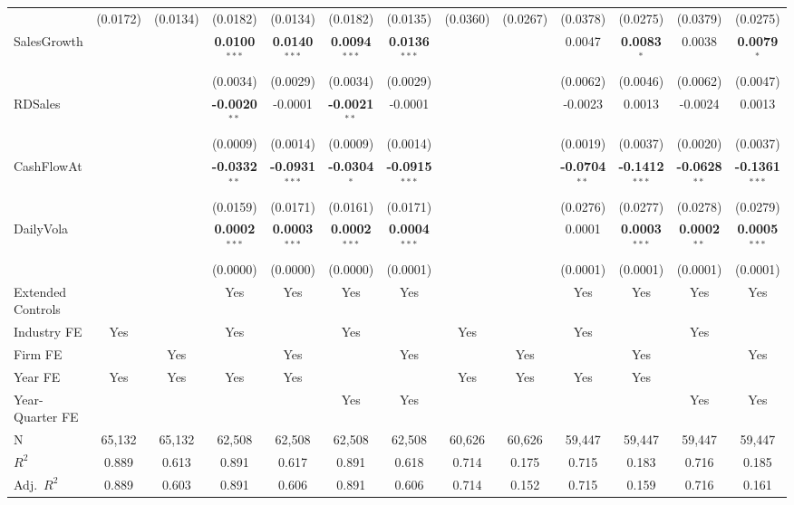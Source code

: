 \documentclass[11pt,a4paper]{article}
\begin{document}
\begin{table}[htbp]
\begin{tabular}{lcccccccccccc}
 & (0.0172) & (0.0134) & (0.0182) & (0.0134) & (0.0182) & (0.0135) & (0.0360) & (0.0267) & (0.0378) & (0.0275) & (0.0379) & (0.0275) \\
SalesGrowth &  &  & \textbf{0.0100}$^{***}$ & \textbf{0.0140}$^{***}$ & \textbf{0.0094}$^{***}$ & \textbf{0.0136}$^{***}$ &  &  & 0.0047 & \textbf{0.0083}$^{*}$ & 0.0038 & \textbf{0.0079}$^{*}$ \\
 &  &  & (0.0034) & (0.0029) & (0.0034) & (0.0029) &  &  & (0.0062) & (0.0046) & (0.0062) & (0.0047) \\
RDSales &  &  & \textbf{-0.0020}$^{**}$ & -0.0001 & \textbf{-0.0021}$^{**}$ & -0.0001 &  &  & -0.0023 & 0.0013 & -0.0024 & 0.0013 \\
 &  &  & (0.0009) & (0.0014) & (0.0009) & (0.0014) &  &  & (0.0019) & (0.0037) & (0.0020) & (0.0037) \\
CashFlowAt &  &  & \textbf{-0.0332}$^{**}$ & \textbf{-0.0931}$^{***}$ & \textbf{-0.0304}$^{*}$ & \textbf{-0.0915}$^{***}$ &  &  & \textbf{-0.0704}$^{**}$ & \textbf{-0.1412}$^{***}$ & \textbf{-0.0628}$^{**}$ & \textbf{-0.1361}$^{***}$ \\
 &  &  & (0.0159) & (0.0171) & (0.0161) & (0.0171) &  &  & (0.0276) & (0.0277) & (0.0278) & (0.0279) \\
DailyVola &  &  & \textbf{0.0002}$^{***}$ & \textbf{0.0003}$^{***}$ & \textbf{0.0002}$^{***}$ & \textbf{0.0004}$^{***}$ &  &  & 0.0001 & \textbf{0.0003}$^{***}$ & \textbf{0.0002}$^{**}$ & \textbf{0.0005}$^{***}$ \\
 &  &  & (0.0000) & (0.0000) & (0.0000) & (0.0001) &  &  & (0.0001) & (0.0001) & (0.0001) & (0.0001) \\
\midrule
Extended Controls &  &  & Yes & Yes & Yes & Yes &  &  & Yes & Yes & Yes & Yes \\
Industry FE & Yes &  & Yes &  & Yes &  & Yes &  & Yes &  & Yes &  \\
Firm FE &  & Yes &  & Yes &  & Yes &  & Yes &  & Yes &  & Yes \\
Year FE & Yes & Yes & Yes & Yes &  &  & Yes & Yes & Yes & Yes &  &  \\
Year-Quarter FE &  &  &  &  & Yes & Yes &  &  &  &  & Yes & Yes \\
\midrule
N & 65,132 & 65,132 & 62,508 & 62,508 & 62,508 & 62,508 & 60,626 & 60,626 & 59,447 & 59,447 & 59,447 & 59,447 \\
$R^2$ & 0.889 & 0.613 & 0.891 & 0.617 & 0.891 & 0.618 & 0.714 & 0.175 & 0.715 & 0.183 & 0.716 & 0.185 \\
Adj.~$R^2$ & 0.889 & 0.603 & 0.891 & 0.606 & 0.891 & 0.606 & 0.714 & 0.152 & 0.715 & 0.159 & 0.716 & 0.161 \\

\end{tabular}
\end{table}
\end{document}
